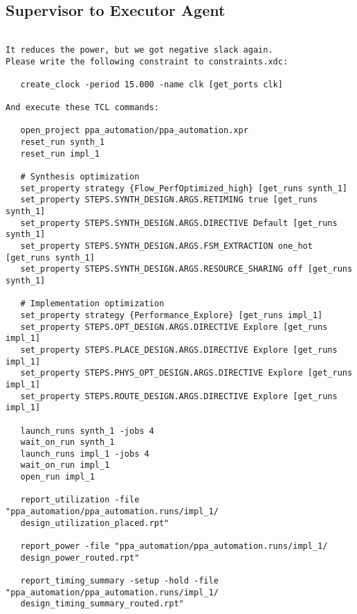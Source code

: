 \subsection{Supervisor to Executor Agent}
\vspace{-0.5em}
\begin{supervisorbox}
\begin{lstlisting}

It reduces the power, but we got negative slack again. 
Please write the following constraint to constraints.xdc:

   create_clock -period 15.000 -name clk [get_ports clk]

And execute these TCL commands:

   open_project ppa_automation/ppa_automation.xpr
   reset_run synth_1
   reset_run impl_1

   # Synthesis optimization
   set_property strategy {Flow_PerfOptimized_high} [get_runs synth_1]
   set_property STEPS.SYNTH_DESIGN.ARGS.RETIMING true [get_runs synth_1]
   set_property STEPS.SYNTH_DESIGN.ARGS.DIRECTIVE Default [get_runs synth_1]
   set_property STEPS.SYNTH_DESIGN.ARGS.FSM_EXTRACTION one_hot [get_runs synth_1]
   set_property STEPS.SYNTH_DESIGN.ARGS.RESOURCE_SHARING off [get_runs synth_1]

   # Implementation optimization
   set_property strategy {Performance_Explore} [get_runs impl_1]
   set_property STEPS.OPT_DESIGN.ARGS.DIRECTIVE Explore [get_runs impl_1]
   set_property STEPS.PLACE_DESIGN.ARGS.DIRECTIVE Explore [get_runs impl_1]
   set_property STEPS.PHYS_OPT_DESIGN.ARGS.DIRECTIVE Explore [get_runs impl_1]
   set_property STEPS.ROUTE_DESIGN.ARGS.DIRECTIVE Explore [get_runs impl_1]

   launch_runs synth_1 -jobs 4
   wait_on_run synth_1
   launch_runs impl_1 -jobs 4
   wait_on_run impl_1
   open_run impl_1

   report_utilization -file "ppa_automation/ppa_automation.runs/impl_1/
   design_utilization_placed.rpt"
   
   report_power -file "ppa_automation/ppa_automation.runs/impl_1/
   design_power_routed.rpt"
   
   report_timing_summary -setup -hold -file "ppa_automation/ppa_automation.runs/impl_1/
   design_timing_summary_routed.rpt"
\end{lstlisting}
\end{supervisorbox}

